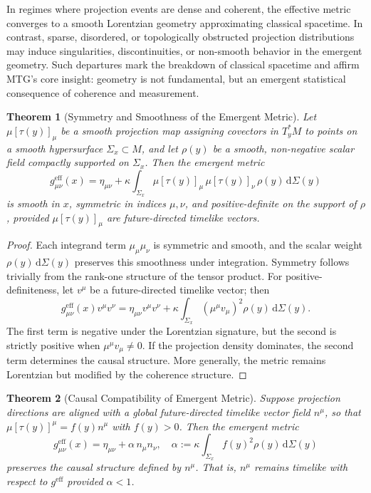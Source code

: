 \documentclass[11pt]{article}
\newtheorem{theorem}{Theorem}
\begin{document}
In regimes where projection events are dense and coherent, the effective metric converges to a smooth Lorentzian geometry approximating classical spacetime. In contrast, sparse, disordered, or topologically obstructed projection distributions may induce singularities, discontinuities, or non-smooth behavior in the emergent geometry. Such departures mark the breakdown of classical spacetime and affirm MTG’s core insight: geometry is not fundamental, but an emergent statistical consequence of coherence and measurement.


\begin{theorem}[Symmetry and Smoothness of the Emergent Metric]
Let \( \mu[\tau(y)]_\mu \) be a smooth projection map assigning covectors in \( T^*_y M \) to points on a smooth hypersurface \( \Sigma_x \subset M \), and let \( \rho(y) \) be a smooth, non-negative scalar field compactly supported on \( \Sigma_x \). Then the emergent metric
\begin{equation}
g^{\mathrm{eff}}_{\mu\nu}(x) = \eta_{\mu\nu} + \kappa \int_{\Sigma_x} \mu[\tau(y)]_\mu \, \mu[\tau(y)]_\nu \, \rho(y) \, \mathrm{d}\Sigma(y)
\end{equation}
is smooth in \( x \), symmetric in indices \( \mu, \nu \), and positive-definite on the support of \( \rho \), provided \( \mu[\tau(y)]_\mu \) are future-directed timelike vectors.
\end{theorem}

\begin{proof}
Each integrand term \( \mu_\mu \mu_\nu \) is symmetric and smooth, and the scalar weight \( \rho(y) \, \mathrm{d}\Sigma(y) \) preserves this smoothness under integration. Symmetry follows trivially from the rank-one structure of the tensor product. For positive-definiteness, let \( v^\mu \) be a future-directed timelike vector; then
\[
g^{\mathrm{eff}}_{\mu\nu}(x) v^\mu v^\nu = \eta_{\mu\nu} v^\mu v^\nu + \kappa \int_{\Sigma_x} (\mu^\mu v_\mu)^2 \rho(y) \, \mathrm{d}\Sigma(y).
\]
The first term is negative under the Lorentzian signature, but the second is strictly positive when \( \mu^\mu v_\mu \neq 0 \). If the projection density dominates, the second term determines the causal structure. More generally, the metric remains Lorentzian but modified by the coherence structure.
\end{proof}

\begin{theorem}[Causal Compatibility of Emergent Metric]
Suppose projection directions are aligned with a global future-directed timelike vector field \( n^\mu \), so that \( \mu[\tau(y)]^\mu = f(y) n^\mu \) with \( f(y) > 0 \). Then the emergent metric
\[
g^{\mathrm{eff}}_{\mu\nu}(x) = \eta_{\mu\nu} + \alpha \, n_\mu n_\nu, \quad \alpha := \kappa \int_{\Sigma_x} f(y)^2 \rho(y) \, \mathrm{d}\Sigma(y)
\]
preserves the causal structure defined by \( n^\mu \). That is, \( n^\mu \) remains timelike with respect to \( g^{\mathrm{eff}} \) provided \( \alpha < 1 \).
\end{theorem}
\end{document}
